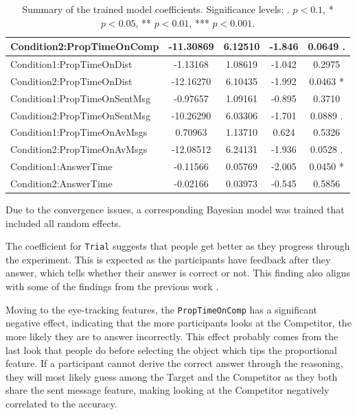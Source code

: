 \begin{table}[h!]
\begin{tabular}{|l|c|c|c|c|}
Condition2:PropTimeOnComp          & -11.30869 & 6.12510 & -1.846 & 0.0649 . \\ \hline
Condition1:PropTimeOnDist           & -1.13168 & 1.08619 & -1.042 & 0.2975 \\ \hline
Condition2:PropTimeOnDist          & -12.16270 & 6.10435 & -1.992 & 0.0463 * \\ \hline
Condition1:PropTimeOnSentMsg        & -0.97657 & 1.09161 & -0.895 & 0.3710 \\ \hline
Condition2:PropTimeOnSentMsg       & -10.26290 & 6.03306 & -1.701 & 0.0889 . \\ \hline
Condition1:PropTimeOnAvMsgs   & 0.70963 & 1.13710 & 0.624 & 0.5326 \\ \hline
Condition2:PropTimeOnAvMsgs & -12.08512 & 6.24131 & -1.936 & 0.0528 . \\ \hline
Condition1:AnswerTime               & -0.11566 & 0.05769 & -2.005 & 0.0450 * \\ \hline
Condition2:AnswerTime               & -0.02166 & 0.03973 & -0.545 & 0.5856 \\ \hline
\end{tabular}
\caption{Summary of the trained model coefficients. Significance levels: . $p < 0.1$, * $p < 0.05$, ** $p < 0.01$, *** $p < 0.001$.}
\label{tab:model_coefficients_acc}
\end{table}

Due to the convergence issues, a corresponding Bayesian model was trained that included all random effects. 




The coefficient for \texttt{Trial} suggests that people get better as they progress through the experiment. This is expected as the participants have feedback after they answer, which tells whether their answer is correct or not. This finding also aligns with some of the findings from the previous work \citep{Mayn_2023, Mayn_2025}. 

Moving to the eye-tracking features, the \texttt{PropTimeOnComp} has a significant negative effect, indicating that the more participants looks at the Competitor, the more likely they are to answer incorrectly. This effect probably comes from the last look that people do before selecting the object which tips the proportional feature. If a participant cannot derive the correct answer through the reasoning, they will most likely guess among the Target and the Competitor as they both share the sent message feature, making looking at the Competitor negatively correlated to the accuracy.

